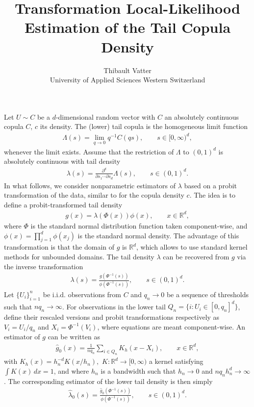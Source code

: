\documentclass[12pt, headinclude=true]{scrartcl}
\title{Transformation Local-Likelihood Estimation of the Tail Copula Density}
\author{Thibault Vatter\\ University of Applied Sciences Western Switzerland}
\begin{document}
\maketitle

Let $U \sim C$ be a $d$-dimensional random vector with $C$ an absolutely
continuous copula $C$, $c$ its density.
The (lower) tail copula is the homogeneous limit function
\begin{align*}%
  \Lambda(s)
  =
  \lim_{q\rightarrow0}
  q^{-1}C(qs),
  \qquad s\in[0,\infty)^d,
\end{align*}
whenever the limit exists.
Assume that the restriction of $\Lambda$ to $(0,1)^d$ is absolutely
continuous with tail density
\begin{align*}
  \lambda(s)
  =
  \frac{\partial^d}{\partial s_1\cdots\partial s_d}\Lambda(s),
  \qquad s\in(0,1)^d.
\end{align*}
In what follows, we consider nonparametric estimators of $\lambda$ based on a probit transformation of the data, similar to \citet{geenens2017probit} for the copula density $c$.
The idea is to define a probit-transformed tail density
\begin{align*}
  g(x)
  =
  \lambda(\Phi(x))\phi(x),
  \qquad x\in\mathbb R^d,
\end{align*}
where $\Phi$ is the standard normal distribution function taken component-wise,
and $\phi(x)=\prod_{j=1}^d\phi(x_j)$ is the standard normal density.
The advantage of this transformation is that the domain of $g$ is $\mathbb R^d$, which allows to use standard kernel methods for unbounded domains.
The tail density $\lambda$ can be recovered from $g$ via the inverse transformation
\begin{align*}
  \lambda(s)
  =
  \frac{
    g(\Phi^{-1}(s))
  }{
    \phi(\Phi^{-1}(s))
  },
  \qquad s\in(0,1)^d.
\end{align*}
Let $\{U_i\}_{i=1}^n$ be i.i.d. observations from $C$ and $q_n\rightarrow0$ be a sequence of thresholds such that $nq_n\to\infty$.
For observations in the lower tail $Q_n= \{i:U_i\in[0,q_n]^d\}$, define their rescaled versions and probit transformations respectively as $V_i=U_i/q_n$ and $X_i=\Phi^{-1}(V_i)$,
where equations are meant component-wise.
An estimator of $g$ can be written as
\begin{align*}
  \hat g_0(x)
  =
  \frac{1}{nq_n}
  \sum_{i \in Q_n}
  K_h(x-X_i),
  \qquad x\in\mathbb R^d,
\end{align*}
with $ K_h(x)=h_n^{-d}K(x/h_n),$
$K:\mathbb R^d\to[0,\infty)$ a kernel satisfying
$\int K(x)\,dx=1$, and
where $h_n$ is a bandwidth such that $h_n\rightarrow0$ and $nq_nh_n^d\to\infty$.
The corresponding estimator of the lower tail density is then simply
\begin{align*}
  \hat\lambda_0(s)
  =
  \frac{
    \hat g_0(\Phi^{-1}(s))
  }{
    \phi(\Phi^{-1}(s))
  },
  \qquad s\in(0,1)^d.
\end{align*}
\end{document}
